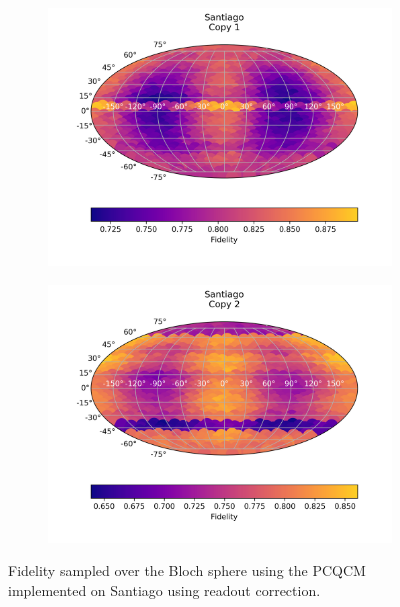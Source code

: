 \begin{figure}[H]
  \centering
  \begin{subfigure}{.5\textwidth}
    \centering
    \includegraphics[width=\textwidth]{Figures/PhaseCovariant/IBM/FullSphere/results_corrected_santiago_copy1.png}
    
    \label{fig:pc_corrected_santiago_sphere_1}
  \end{subfigure}%
  \begin{subfigure}{.5\textwidth}
    \centering
    \includegraphics[width=\textwidth]{Figures/PhaseCovariant/IBM/FullSphere/results_corrected_santiago_copy2.png}
    
    \label{fig:pc_corrected_santiago_sphere_2}
  \end{subfigure}
  \caption{Fidelity sampled over the Bloch sphere using the PCQCM implemented on Santiago using readout correction.}
  \label{fig:pc_corrected_santiago_sphere}
\end{figure}


